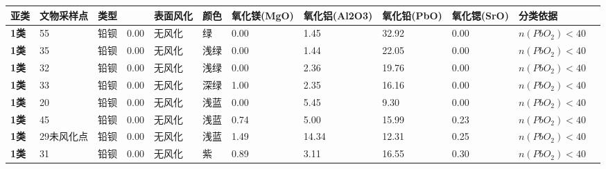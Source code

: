 \documentclass[withoutpreface,bwprint]{cumcmthesis} %
\begin{document}
\begin{appendices}
	\begin{table}[!h]
		\centering
		\tiny
		\begin{tabular}{@{}llllllllllll@{}}
			\toprule
			\textbf{亚类} & \textbf{文物采样点} & \textbf{类型} & \textbf{} & \textbf{表面风化} & \textbf{颜色} & \textbf{氧化镁(MgO)} & \textbf{氧化铝(Al2O3)} & \textbf{氧化铅(PbO)} & \textbf{氧化锶(SrO)} & \textbf{分类依据}                          & \textbf{} \\ \midrule
			\textbf{1类} & 55             & 铅钡          & 0.00      & 无风化           & 绿           & 0.00              & 1.45                & 32.92             & 0.00              & $n(PbO_2)<40$                          &           \\
			\textbf{1类} & 35             & 铅钡          & 0.00      & 无风化           & 浅绿          & 0.00              & 1.44                & 22.05             & 0.00              & $n(PbO_2)<40$                          &           \\
			\textbf{1类} & 32             & 铅钡          & 0.00      & 无风化           & 浅绿          & 0.00              & 2.36                & 19.76             & 0.00              & $n(PbO_2)<40$                          &           \\
			\textbf{1类} & 33             & 铅钡          & 0.00      & 无风化           & 深绿          & 1.00              & 2.35                & 16.16             & 0.00              & $n(PbO_2)<40$                          &           \\
			\textbf{1类} & 20             & 铅钡          & 0.00      & 无风化           & 浅蓝          & 0.00              & 5.45                & 9.30              & 0.00              & $n(PbO_2)<40$                          &           \\
			\textbf{1类} & 45             & 铅钡          & 0.00      & 无风化           & 浅蓝          & 0.74              & 5.00                & 15.99             & 0.23              & $n(PbO_2)<40$                          &           \\
			\textbf{1类} & 29未风化点         & 铅钡          & 0.00      & 无风化           & 浅蓝          & 1.49              & 14.34               & 12.31             & 0.25              & $n(PbO_2)<40$                          &           \\
			\textbf{1类} & 31             & 铅钡          & 0.00      & 无风化           & 紫           & 0.89              & 3.11                & 16.55             & 0.30              & $n(PbO_2)<40$                          &           \\

\end{tabular}
\end{table}
\end{appendices}
\end{document}
